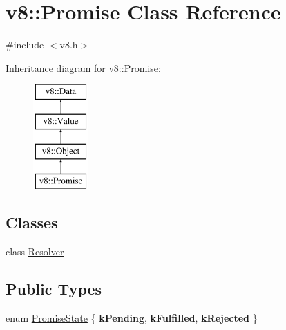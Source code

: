 \hypertarget{classv8_1_1Promise}{}\section{v8\+:\+:Promise Class Reference}
\label{classv8_1_1Promise}


{\ttfamily \#include $<$v8.\+h$>$}

Inheritance diagram for v8\+:\+:Promise\+:\begin{figure}[H]
\begin{center}
\leavevmode
\includegraphics[height=4.000000cm]{classv8_1_1Promise}
\end{center}
\end{figure}
\subsection*{Classes}
\begin{DoxyCompactItemize}
\item 
class \mbox{\hyperlink{classv8_1_1Promise_1_1Resolver}{Resolver}}
\end{DoxyCompactItemize}
\subsection*{Public Types}
\begin{DoxyCompactItemize}
\item 
enum \mbox{\hyperlink{classv8_1_1Promise_a0c357b9d99a634f98a5a203b0a322544}{Promise\+State}} \{ {\bfseries k\+Pending}, 
{\bfseries k\+Fulfilled}, 
{\bfseries k\+Rejected}
 \}
\end{DoxyCompactItemize}
